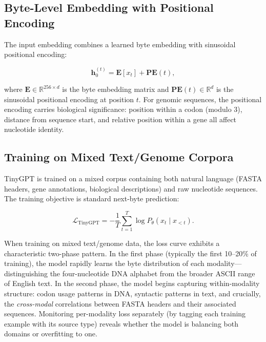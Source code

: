 \subsection{Byte-Level Embedding with Positional Encoding}

The input embedding combines a learned byte embedding with sinusoidal positional encoding:

\begin{equation}
\mathbf{h}_0^{(t)} = \mathbf{E}[x_t] + \mathbf{PE}(t),
\label{eq:tinygpt-embed}
\end{equation}

where $\mathbf{E} \in \mathbb{R}^{256 \times d}$ is the byte embedding matrix and $\mathbf{PE}(t) \in \mathbb{R}^d$ is the sinusoidal positional encoding at position $t$. For genomic sequences, the positional encoding carries biological significance: position within a codon (modulo 3), distance from sequence start, and relative position within a gene all affect nucleotide identity.

\subsection{Training on Mixed Text/Genome Corpora}

TinyGPT is trained on a mixed corpus containing both natural language (FASTA headers, gene annotations, biological descriptions) and raw nucleotide sequences. The training objective is standard next-byte prediction:

\begin{equation}
\mathcal{L}_{\text{TinyGPT}} = -\frac{1}{T} \sum_{t=1}^{T} \log P_\theta(x_t \mid x_{<t}).
\label{eq:tinygpt-loss}
\end{equation}

\begin{implnote}
When training on mixed text/genome data, the loss curve exhibits a characteristic two-phase pattern. In the first phase (typically the first 10--20\% of training), the model rapidly learns the byte distribution of each modality---distinguishing the four-nucleotide DNA alphabet from the broader ASCII range of English text. In the second phase, the model begins capturing within-modality structure: codon usage patterns in DNA, syntactic patterns in text, and crucially, the \emph{cross-modal} correlations between FASTA headers and their associated sequences. Monitoring per-modality loss separately (by tagging each training example with its source type) reveals whether the model is balancing both domains or overfitting to one.
\end{implnote}

